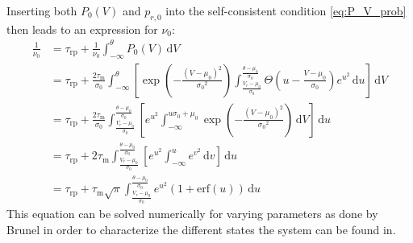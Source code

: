 Inserting both $P_0(V)$ and $p_{r, 0}$ into the self-consistent condition \eqref{eq:P_V_prob}
then leads to an expression for $\nu_0$:
\begin{equation}
    \begin{split}
        \frac{1}{\nu_0} 	
            &= \tau_\text{rp} + \frac{1}{\nu_0} \int_{-\infty}^{\theta} \! P_0(V) \, \text{d}V  \\ 
            &= \tau_\text{rp} + \frac{2 \tau_\text{m}}{\sigma_0} 
                \int_{-\infty}^{\theta} \! \left[ 
                    \exp{\left(- \frac{(V - \mu_0)^2}{{\sigma_0}^2} \right)}
                    \int_{\frac{V_r - \mu_0}{\sigma_0}}^{\frac{\theta - \mu_0}{\sigma_0}} \! 
                        \Theta \left(u - \frac{V - \mu_0}{\sigma_0} \right) e^{u^2} \, \text{d}u 
                    \right] \, \text{d}V  \\ 
            &= \tau_\text{rp} + \frac{2 \tau_\text{m}}{\sigma_0} 
                \int_{\frac{V_r - \mu_0}{\sigma_0}}^{\frac{\theta - \mu_0}{\sigma_0}} \! 
                    \left[ 
                        e^{u^2}
                        \int_{-\infty}^{u \sigma_0 + \mu_0} \! 
                        \exp{\left(- \frac{(V - \mu_0)^2}{{\sigma_0}^2} \right)}
                        \, \text{d}V
                    \right] \, \text{d}u  \\ 
            &= \tau_\text{rp} + 2 \tau_\text{m}
                \int_{\frac{V_r - \mu_0}{\sigma_0}}^{\frac{\theta - \mu_0}{\sigma_0}} \! 
                    \left[ 
                        e^{u^2}
                        \int_{-\infty}^{u} \! e^{v^2} \, \text{d}v
                    \right] \, \text{d}u  \\ 
            &= \tau_\text{rp} + \tau_\text{m} \sqrt{\pi}
                \int_{\frac{V_r - \mu_0}{\sigma_0}}^{\frac{\theta - \mu_0}{\sigma_0}} \! 
                e^{u^2} \left(1 + \text{erf}(u)\right)
                \, \text{d}u  
        \label{eq:self_consistency}
    \end{split}
\end{equation}
This equation can be solved numerically for varying parameters as done by Brunel in order to 
characterize the different states the system can be found in. 

